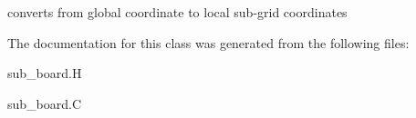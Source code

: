 converts from global coordinate to local sub-\/grid coordinates 

The documentation for this class was generated from the following files\-:\begin{DoxyCompactItemize}
\item 
sub\-\_\-board.\-H\item 
sub\-\_\-board.\-C\end{DoxyCompactItemize}
